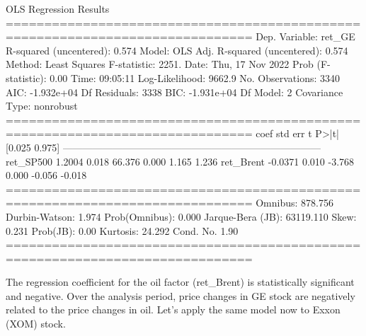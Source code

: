 \begin{ioutput}
OLS Regression Results
==============================================================================
Dep. Variable:                 ret_GE   R-squared (uncentered):          0.574
Model:                            OLS   Adj. R-squared (uncentered):     0.574
Method:                 Least Squares   F-statistic:                     2251.
Date:                Thu, 17 Nov 2022   Prob (F-statistic):               0.00
Time:                        09:05:11   Log-Likelihood:                 9662.9
No. Observations:                3340   AIC:                        -1.932e+04
Df Residuals:                    3338   BIC:                        -1.931e+04
Df Model:                           2
Covariance Type:            nonrobust
==============================================================================
coef          std err          t      P>|t|      [0.025      0.975]
------------------------------------------------------------------------------
ret_SP500      1.2004      0.018     66.376      0.000       1.165       1.236
ret_Brent     -0.0371      0.010     -3.768      0.000      -0.056      -0.018
==============================================================================
Omnibus:                      878.756   Durbin-Watson:                   1.974
Prob(Omnibus):                  0.000   Jarque-Bera (JB):            63119.110
Skew:                           0.231   Prob(JB):                         0.00
Kurtosis:                      24.292   Cond. No.                         1.90
==============================================================================
\end{ioutput}

The regression coefficient for the oil factor (ret\_Brent) is statistically significant and negative. Over the analysis period, price changes in GE stock are negatively related to the price changes in oil.
Let's apply the same model now to Exxon (XOM) stock.

